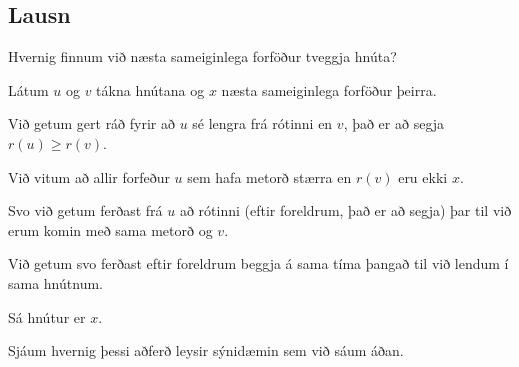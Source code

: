 \subsection{Lausn}
{
    {
        \item<1-> Hvernig finnum við næsta sameiginlega forföður tveggja hnúta?
        \item<2-> Látum $u$ og $v$ tákna hnútana og $x$ næsta sameiginlega forföður þeirra.
        \item<3-> Við getum gert ráð fyrir að $u$ sé lengra frá rótinni en $v$, það er að segja $r(u) \geq r(v)$.
        \item<4-> Við vitum að allir forfeður $u$ sem hafa metorð stærra en $r(v)$ eru ekki $x$.
        \item<5-> Svo við getum ferðast frá $u$ að rótinni (eftir foreldrum, það er að segja) þar til við erum komin með sama metorð og $v$.
        \item<6-> Við getum svo ferðast eftir foreldrum beggja á sama tíma þangað til við lendum í sama hnútnum.
        \item<7-> Sá hnútur er $x$.
        \item<8-> Sjáum hvernig þessi aðferð leysir sýnidæmin sem við sáum áðan.
    }
}


